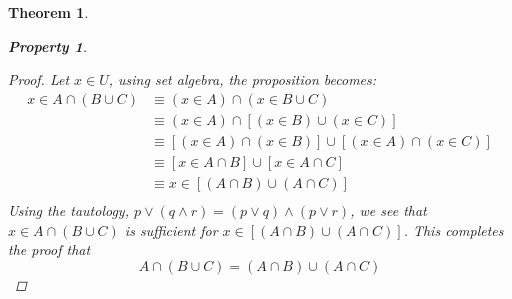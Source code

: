 \documentclass{book}
\newtheorem{theorem}{Theorem}[section]
\newtheorem{property}{Property}[theorem]
\theoremstyle{definition}
\theoremstyle{remark}
\begin{document}
\begin{theorem}
\begin{property}
        \begin{proof}
            Let $x \in U$, using set algebra, the proposition becomes: 
                \begin{align*}
                    x \in A \cap (B \cup C) & \equiv (x \in A) \cap (x \in B \cup C) \\
                    & \equiv (x \in A) \cap [(x \in B) \cup (x \in C)] \\
                    & \equiv [(x \in A) \cap (x \in B)] \cup [(x \in A) \cap (x \in C)] \\
                    & \equiv [x \in A \cap B] \cup [x \in A \cap C] \\
                    & \equiv x \in [(A \cap B) \cup (A \cap C)] \\
                \end{align*}
            Using the tautology, $p \vee (q \wedge r) = (p \vee q) \wedge (p \vee r)$, we see that $x \in A \cap (B \cup C)$ is sufficient for $x \in [(A \cap B) \cup (A \cap C)]$. This completes the proof that $$ A \cap (B \cup C) = (A \cap B) \cup (A \cap C) $$
        \end{proof}
    \end{property}

\end{theorem}
\end{document}
